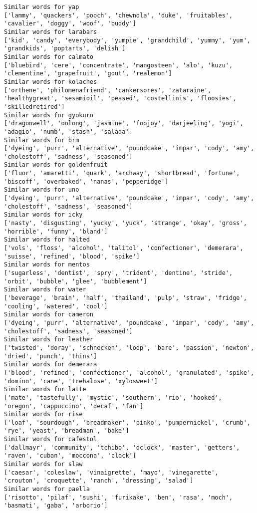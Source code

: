 \documentclass[11pt]{article}
\begin{document}
\begin{Verbatim}[commandchars=\\\{\}]
Similar words for yap
['lammy', 'quackers', 'pooch', 'chewnola', 'duke', 'fruitables', 'cavalier', 'doggy', 'woof', 'buddy']
Similar words for larabars
['kid', 'candy', 'everybody', 'yumpie', 'grandchild', 'yummy', 'yum', 'grandkids', 'poptarts', 'delish']
Similar words for calmato
['bluebird', 'cere', 'concentrate', 'mangosteen', 'alo', 'kuzu', 'clementine', 'grapefruit', 'gout', 'realemon']
Similar words for kolaches
['orthene', 'philomenafriend', 'cankersores', 'zataraine', 'healthygreat', 'sesamioil', 'peased', 'costellinis', 'floosies', 'skilledretired']
Similar words for gyokuro
['dragonwell', 'oolong', 'jasmine', 'foojoy', 'darjeeling', 'yogi', 'adagio', 'numb', 'stash', 'salada']
Similar words for brm
['dyeing', 'purr', 'alternative', 'poundcake', 'impar', 'cody', 'amy', 'cholestoff', 'sadness', 'seasoned']
Similar words for goldenfruit
['fluor', 'amaretti', 'quark', 'archway', 'shortbread', 'fortune', 'biscoff', 'overbaked', 'nanas', 'pepperidge']
Similar words for uno
['dyeing', 'purr', 'alternative', 'poundcake', 'impar', 'cody', 'amy', 'cholestoff', 'sadness', 'seasoned']
Similar words for icky
['nasty', 'disgusting', 'yucky', 'yuck', 'strange', 'okay', 'gross', 'horrible', 'funny', 'bland']
Similar words for halted
['vols', 'floss', 'alcohol', 'talitol', 'confectioner', 'demerara', 'suisse', 'refined', 'blood', 'spike']
Similar words for mentos
['sugarless', 'dentist', 'spry', 'trident', 'dentine', 'stride', 'orbit', 'bubble', 'glee', 'bubblement']
Similar words for water
['beverage', 'brain', 'half', 'thailand', 'pulp', 'straw', 'fridge', 'cooling', 'watered', 'cool']
Similar words for cameron
['dyeing', 'purr', 'alternative', 'poundcake', 'impar', 'cody', 'amy', 'cholestoff', 'sadness', 'seasoned']
Similar words for leather
['twisted', 'doray', 'schnecken', 'loop', 'bare', 'passion', 'newton', 'dried', 'punch', 'thins']
Similar words for demerara
['blood', 'refined', 'confectioner', 'alcohol', 'granulated', 'spike', 'domino', 'cane', 'trehalose', 'xylosweet']
Similar words for latte
['mate', 'tastefully', 'mystic', 'southern', 'rio', 'hooked', 'oregon', 'cappuccino', 'decaf', 'fan']
Similar words for rise
['loaf', 'sourdough', 'breadmaker', 'pinko', 'pumpernickel', 'crumb', 'rye', 'yeast', 'breadman', 'bake']
Similar words for cafestol
['dallmayr', 'community', 'tchibo', 'oclock', 'master', 'getters', 'raven', 'cuban', 'moccona', 'clock']
Similar words for slaw
['caesar', 'coleslaw', 'vinaigrette', 'mayo', 'vinegarette', 'crouton', 'croquette', 'ranch', 'dressing', 'salad']
Similar words for paella
['risotto', 'pilaf', 'sushi', 'furikake', 'ben', 'rasa', 'moch', 'basmati', 'gaba', 'arborio']

\end{Verbatim}
\end{document}
